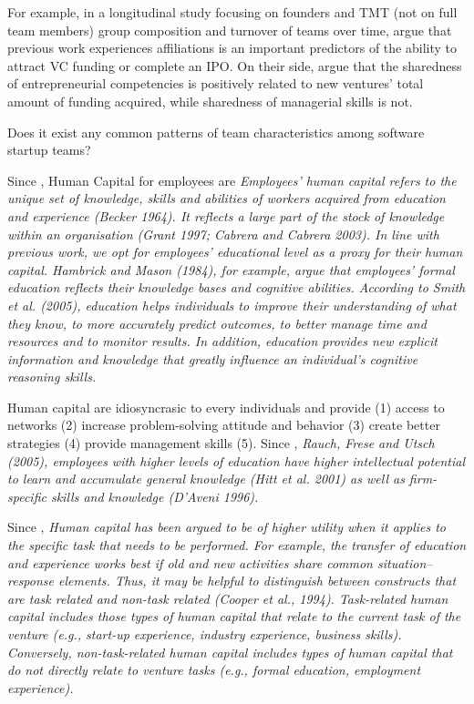 For example, in a longitudinal study focusing on founders and TMT (not on full team members) group composition and turnover of teams over time, \citet{beckman2007early} argue that previous work experiences affiliations is an important predictors of the ability to attract VC funding or complete an IPO. On their side, \citet{reese2020should} argue that the sharedness of entrepreneurial competencies is positively related to new ventures' total amount of funding acquired, while sharedness of managerial skills is not.

Does it exist any common patterns of team characteristics among software startup teams?

Since \citep{de2010interrelationships}, Human Capital for employees are \textit{Employees’ human capital refers to the unique set of knowledge, skills and abilities of workers acquired from education and experience (Becker 1964). It reflects a large part of the stock of knowledge within an organisation (Grant 1997; Cabrera and Cabrera 2003). In line with previous work, we opt for employees’ educational level as a proxy for their human capital. Hambrick and Mason (1984), for example, argue that employees’ formal education reflects their knowledge bases and cognitive abilities. According to Smith et al. (2005), education helps individuals to improve their understanding of what they know, to more accurately predict outcomes, to better manage time and resources and to monitor results. In addition, education provides new explicit information and knowledge that greatly influence an individual’s cognitive reasoning skills.}

Human capital are idiosyncrasic to every individuals and provide (1) access to networks (2) increase problem-solving attitude and behavior (3) create better strategies (4) provide management skills (5). Since \citep{de2010interrelationships}, \textit{Rauch, Frese and Utsch (2005), employees with higher levels of education have higher intellectual potential to learn and accumulate general knowledge (Hitt et al. 2001) as well as firm-specific skills and knowledge (D’Aveni 1996).}\newline

Since \citep{marvel2016human}, \textit{Human capital has been argued to be of higher utility when it applies to the specific task that needs to be performed. For example, the transfer of education and experience works best if old and new activities share common situation–response elements. Thus, it may be helpful to distinguish between constructs that are task related and non-task related (Cooper et al., 1994). Task-related human capital includes those types of human capital that relate to the current task of the venture (e.g., start-up experience, industry experience, business skills). Conversely, non-task-related human capital includes types of human capital that do not directly relate to venture tasks (e.g., formal education, employment experience).}\newline

